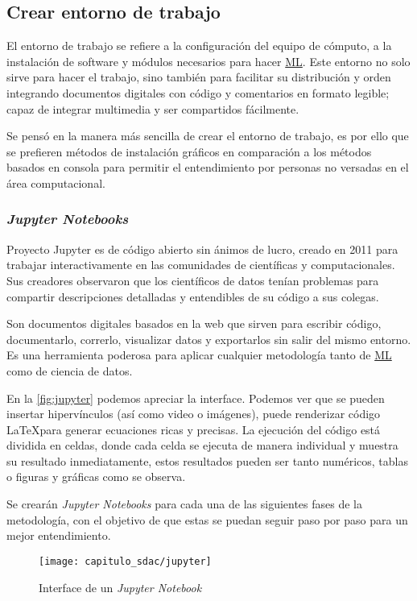 \subsection{Crear entorno de trabajo}

El entorno de trabajo se refiere a la configuración del equipo de cómputo, a la
instalación de software y módulos necesarios para hacer \hyperlink{abbr}{ML}.
Este entorno no solo sirve para hacer el trabajo, sino también para facilitar su
distribución y orden integrando documentos digitales con código y comentarios en
formato legible; capaz de integrar multimedia y ser compartidos fácilmente.

Se pensó en la manera más sencilla de crear el entorno de trabajo, es por ello
que se prefieren métodos de instalación gráficos en comparación a los métodos
basados en consola para permitir el entendimiento por personas no versadas en el
área computacional.

\subsubsection{\emph{Jupyter Notebooks}}

Proyecto Jupyter es de código abierto sin ánimos de lucro, creado en 2011 para
trabajar interactivamente en las comunidades de científicas y computacionales.
Sus creadores observaron que los científicos de datos tenían problemas para
compartir descripciones detalladas y entendibles de su código a sus colegas. 

Son documentos digitales basados en la web que sirven para escribir código,
documentarlo, correrlo, visualizar datos y exportarlos sin salir del mismo
entorno. Es una herramienta poderosa para aplicar cualquier metodología tanto de
\hyperlink{abbr}{ML} como de ciencia de datos.

En la \autoref{fig:jupyter} podemos apreciar la interface. Podemos ver que se
pueden insertar hipervínculos (así como video o imágenes), puede renderizar
código \LaTeX para generar ecuaciones ricas y precisas. La ejecución del código
está dividida en celdas, donde cada celda se ejecuta de manera individual y
muestra su resultado inmediatamente, estos resultados pueden ser tanto
numéricos, tablas o figuras y gráficas como se observa.

Se crearán \emph{Jupyter Notebooks} para cada una de las siguientes fases de la
metodología, con el objetivo de que estas se puedan seguir paso por paso para un
mejor entendimiento.

\begin{figure}[H]
    \centering
    \texttt{[image: capitulo\_sdac/jupyter]}
    \caption{Interface de un \emph{Jupyter Notebook}}\label{fig:jupyter}
\end{figure}
    
